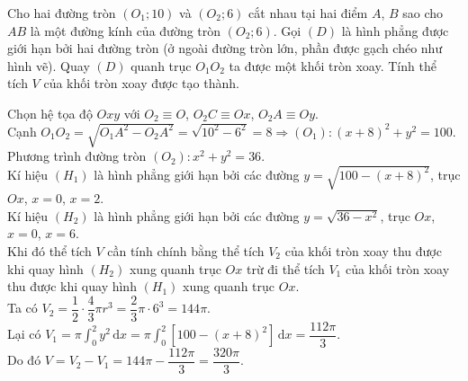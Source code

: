 \begin{ex}%
	Cho hai đường tròn $(O_1;10)$ và $(O_2;6)$ cắt nhau tại hai điểm $A$, $B$ sao cho $AB$ là một đường kính của đường tròn $(O_2;6)$. Gọi $(D)$ là hình phẳng được giới hạn bởi hai đường tròn (ở ngoài đường tròn lớn, phần được gạch chéo như hình vẽ). Quay $(D)$ quanh trục $O_1 O_2$ ta được một khối tròn xoay. Tính thể tích $V$ của khối tròn xoay được tạo thành.
\begin{center}
\end{center}
	
	\loigiai
	{
		Chọn hệ tọa độ $Oxy$ với $O_2 \equiv O$, $O_2 C \equiv Ox$, $O_2 A \equiv Oy$.\\
		Cạnh $O_1 O_2=\sqrt{O_1 A^2-O_2 A^2}=\sqrt{10^2-6^2}=8 \Rightarrow(O_1)\colon (x+8)^2+y^2=100$.\\
		Phương trình đường tròn $(O_2)\colon x^2+y^2=36$.\\
		Kí hiệu $(H_1)$ là hình phẳng giới hạn bởi các đường $y=\sqrt{100-(x+8)^2}$, trục $Ox$, $x=0$, $x=2$.\\	
		Kí hiệu $(H_2)$ là hình phẳng giới hạn bởi các đường $y=\sqrt{36-x^2}$, trục $Ox$, $x=0$, $x=6$.\\
		Khi đó thể tích $V$ cần tính chính bằng thể tích $V_2$ của khối tròn xoay thu được khi quay hình $(H_2)$ xung quanh trục $Ox$ trừ đi thể tích $V_1$ của khối tròn xoay thu được khi quay hình $(H_1)$ xung quanh trục $Ox$.\\
		Ta có $V_2=\dfrac{1}{2} \cdot \dfrac{4}{3} \pi r^3=\dfrac{2}{3} \pi \cdot 6^3=144 \pi$.\\
		Lại có $V_1=\pi \displaystyle\int_0^2 y^2 \mathrm{\,d}x=\pi \displaystyle\int_0^2 [100-(x+8)^2] \mathrm{\,d}x=\dfrac{112 \pi}{3}$.\\
		Do đó $V=V_2-V_1=144 \pi-\dfrac{112 \pi}{3}=\dfrac{320 \pi}{3}$.
	}
\end{ex}

